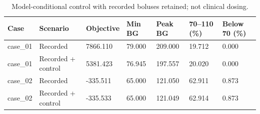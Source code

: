 \begin{table}[htbp]
\centering
\small
\caption{Model-conditional control with recorded boluses retained; not clinical dosing.}
\label{tab:extra-control}
\begin{tabular}{lllllll}
\toprule
Case & Scenario & Objective & Min BG & Peak BG & 70--110 (\%) & Below 70 (\%) \\
\midrule
case\_01 & Recorded & 7866.110 & 79.000 & 209.000 & 19.712 & 0.000 \\
case\_01 & Recorded + control & 5381.423 & 76.945 & 197.557 & 20.020 & 0.000 \\
case\_02 & Recorded & -335.511 & 65.000 & 121.050 & 62.911 & 0.873 \\
case\_02 & Recorded + control & -335.533 & 65.000 & 121.049 & 62.914 & 0.873 \\
\bottomrule
\end{tabular}
\end{table}
